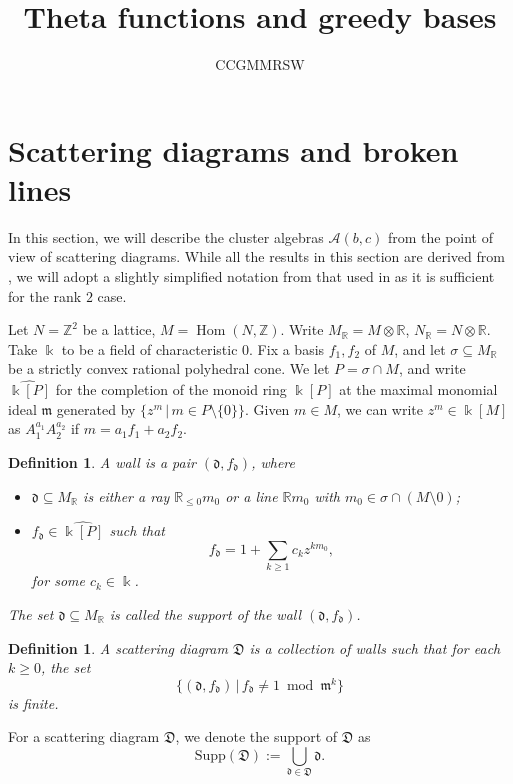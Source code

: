 \documentclass[12pt]{amsart}
\title{Theta functions and greedy bases}
\author{CCGMMRSW}
\newtheorem{defn}[theorem]{Definition}
\theoremstyle{remark}
\newcommand{\ZZ}{\mathbb{Z}}
\newcommand{\RR}{\mathbb{R}}
\newcommand{\cA}{\mathcal{A}}
\newcommand{\Hom}{\operatorname{Hom}}
\newcommand{\dd}{\mathfrak{d}}
\newcommand{\DD}{\mathfrak{D}}
\newcommand{\fom}{\mathfrak{m}}
\begin{document}
\maketitle

\section{Scattering diagrams and broken lines}
In this section, we will describe the cluster algebras $\cA (b,c)$ from 
the point of view of scattering diagrams. While all the results in this section
are derived from \cite{GHKK}, we will adopt a slightly simplified notation
from that used in \cite{GHKK} as it is sufficient for the rank $2$ case.

Let $N = \ZZ^2$ be a lattice, $M = \Hom (N, \ZZ)$. Write $M_{\RR} = M \otimes 
\RR$, $N_{\RR} = N\otimes \RR$. Take $\Bbbk$ to be a 
field of characteristic 0. Fix a basis $f_1, f_2$ of $M$, and let
$\sigma \subseteq M_{\RR}$ be a strictly convex rational polyhedral
cone. We let $P=\sigma \cap M$, and write $\widehat{\Bbbk[P]}$ for the
completion of the monoid ring $\Bbbk[P]$ at the maximal monomial ideal
$\fom$
generated by $\{z^m \,|\, m\in P\setminus\{0\}\}$.
Given $m\in M$, we can write $z^m \in \Bbbk[M]$ as
$A_1^{a_1} A_2^{a_2}$ if $m=a_1f_1+a_2f_2$.

\begin{defn}
\label{walldef}
A \emph{wall} is a pair $(\dd, f_{\dd})$, where 
\begin{itemize}
    \item $\dd \subseteq M_{\mathbb{R}}$ is either a ray $\RR_{\le 0}m_0$ 
or a line $\RR m_0$ with $m_0\in \sigma \cap(M\setminus 0)$;
    \item $f_{\dd} \in \widehat{\Bbbk [P]}$ such that
    \[ f_{\dd} = 1 + \sum_{k\geq 1} c_k z^{k m_0},\]
    for some $c_k \in \Bbbk$. 
\end{itemize}
The set $\dd \subseteq M_{\mathbb{R}}$ is called the support of the wall $(\dd, f_{\dd})$.
\end{defn}

\begin{defn}
A scattering diagram $\DD$ is a collection of walls such that for each $k \geq 0$, the set
\[  \{ (\dd, f_{\dd})\, |\, f_{\dd} \neq 1 \bmod \fom^k   \}\]
is finite. 
\end{defn}

For a scattering diagram $\DD$, we denote the support of $\DD$ as
\[\text{Supp} (\DD) := \bigcup_{\dd \in \DD} \dd. \]
\end{document}
